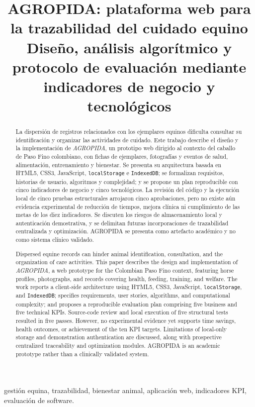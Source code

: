 \documentclass[conference,10pt]{IEEEtran}
\begin{document}
\title{AGROPIDA: plataforma web para la trazabilidad del cuidado equino\\\large Diseño, análisis algorítmico y protocolo de evaluación mediante indicadores de negocio y tecnológicos}
\author{
}
\maketitle
\renewcommand{\abstractname}{Resumen}
\begin{abstract}
La dispersión de registros relacionados con los ejemplares equinos dificulta consultar su identificación y organizar las actividades de cuidado. Este trabajo describe el diseño y la implementación de \emph{AGROPIDA}, un prototipo web dirigido al contexto del caballo de Paso Fino colombiano, con fichas de ejemplares, fotografías y eventos de salud, alimentación, entrenamiento y bienestar. Se presenta su arquitectura basada en HTML5, CSS3, JavaScript, \texttt{localStorage} e \texttt{IndexedDB}; se formalizan requisitos, historias de usuario, algoritmos y complejidad; y se propone un plan reproducible con cinco indicadores de negocio y cinco tecnológicos. La revisión del código y la ejecución local de cinco pruebas estructurales arrojaron cinco aprobaciones, pero no existe aún evidencia experimental de reducción de tiempos, mejora clínica ni cumplimiento de las metas de los diez indicadores. Se discuten los riesgos de almacenamiento local y autenticación demostrativa, y se delimitan futuras incorporaciones de trazabilidad centralizada y optimización. AGROPIDA se presenta como artefacto académico y no como sistema clínico validado.
\end{abstract}
\begin{IEEEkeywords}
gestión equina, trazabilidad, bienestar animal, aplicación web, indicadores KPI, evaluación de software.
\end{IEEEkeywords}
\renewcommand{\abstractname}{Abstract}
\begin{abstract}
Dispersed equine records can hinder animal identification, consultation, and the organization of care activities. This paper describes the design and implementation of \emph{AGROPIDA}, a web prototype for the Colombian Paso Fino context, featuring horse profiles, photographs, and records covering health, feeding, training, and welfare. The work reports a client-side architecture using HTML5, CSS3, JavaScript, \texttt{localStorage}, and \texttt{IndexedDB}; specifies requirements, user stories, algorithms, and computational complexity; and proposes a reproducible evaluation plan comprising five business and five technical KPIs. Source-code review and local execution of five structural tests resulted in five passes. However, no experimental evidence yet supports time savings, health outcomes, or achievement of the ten KPI targets. Limitations of local-only storage and demonstration authentication are discussed, along with prospective centralized traceability and optimization modules. AGROPIDA is an academic prototype rather than a clinically validated system.
\end{abstract}
\end{document}
